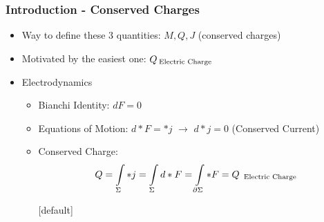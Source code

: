 \documentclass[t]{beamer}
\begin{document}
\begin{frame}
\frametitle{Introduction - Conserved Charges}

\begin{itemize}
\setlength{\parskip}{17pt}

\item<1-> Way to define these 3 quantities: $M,Q,J$ (conserved charges)

\item<2-> Motivated by the easiest one: $Q_{\text{\:Electric Charge}}$

\item<3-> Electrodynamics

\begin{itemize}
[triangle]
\setlength{\parskip}{5pt}
\item Bianchi Identity: $dF = 0$
\item<4-> Equations of Motion: $d*F = *j$ \:\:\: $\rightarrow$ \:\:\: $d*j = 0$ (Conserved Current)
\item<5-> Conserved Charge:
\begin{align}
Q = \int\limits_{\Sigma} *j = \int\limits_{\Sigma} d*F = \int\limits_{\partial\Sigma} *F = Q_{\text{\: Electric Charge}} \notag
\end{align}

[default]
\end{itemize}

\end{itemize}
\end{frame}

\end{document}
